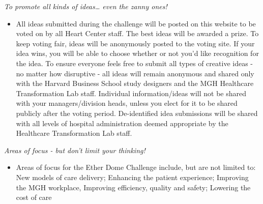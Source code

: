 \documentclass[11pt, titlepage]{article}
\providecommand{\tightlist}{%
  \setlength{\itemsep}{0pt}\setlength{\parskip}{0pt}}
\begin{document}
\emph{To promote all kinds of ideas\ldots{} even the zanny ones!}

\begin{itemize}
\tightlist
\item
  All ideas submitted during the challenge will be posted on this
  website to be voted on by all Heart Center staff. The best ideas will
  be awarded a prize. To keep voting fair, ideas will be anonymously
  posted to the voting site. If your idea wins, you will be able to
  choose whether or not you'd like recognition for the idea. To ensure
  everyone feels free to submit all types of creative ideas - no matter
  how disruptive - all ideas will remain anonymous and shared only with
  the Harvard Business School study designers and the MGH Healthcare
  Transformation Lab staff. Individual information/ideas will not be
  shared with your managers/division heads, unless you elect for it to
  be shared publicly after the voting period. De-identified idea
  submissions will be shared with all levels of hospital administration
  deemed appropriate by the Healthcare Transformation Lab staff.
\end{itemize}

\emph{Areas of focus - but don't limit your thinking!}

\begin{itemize}
\tightlist
\item
  Areas of focus for the Ether Dome Challenge include, but are not
  limited to: New models of care delivery; Enhancing the patient
  experience; Improving the MGH workplace, Improving efficiency, quality
  and safety; Lowering the cost of care
\end{itemize}


\end{document}
